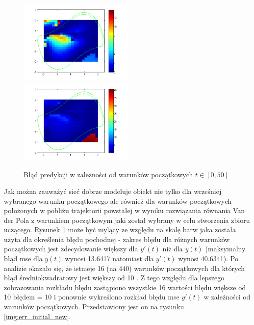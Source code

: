 \begin{figure}[ht!]
	\centering

	\subfloat
	{\includegraphics[width=0.5\textwidth]
	{images/figure_signal.png}}
	\subfloat
	{\includegraphics[width=0.5\textwidth]
	{images/figure_deriv.png}}	
	

	\caption{Błąd predykcji w zależności od warunków początkowych $t \in [0,50]$}
	\label{img:err_initial}
\end{figure}

Jak można zauważyć sieć dobrze modeluje obiekt nie tylko dla wcześniej wybranego warunku początkowego ale również dla warunków początkowych położonych w pobliżu trajektorii powstałej w wyniku rozwiązania równania Van der Pola z warunkiem początkowym jaki został wybrany w celu stworzenia zbioru uczącego. Rysunek \ref{img:err_initial} może być mylący ze względu na skalę barw jaka została użyta dla określenia błędu pochodnej - zakres błędu dla różnych warunków początkowych jest zdecydowanie większy dla $y'(t)$ niż dla $y(t)$ (maksymalny błąd mse dla $y(t)$ wynosi 13.6417 natomiast dla $y'(t)$ wynosi 40.6341). Po analizie okazało się, że istnieje 16 (na 440) warunków początkowych dla których błąd średniokwadratowy jest większy od 10 . Z tego względu dla lepszego zobrazowania rozkładu błędu zastąpiono wszystkie 16 wartości błędu większe od 10 błędem = 10 i ponownie wykreślono rozkład błędu mse $y'(t)$ w zależności od warunków początkowych. Przedstawiony jest on na rysunku \ref{img:err_initial_new}.


